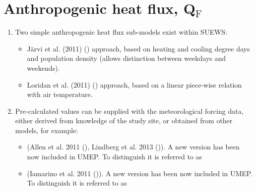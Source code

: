 \documentclass[letterpaper,10pt,english]{sphinxmanual}
\begin{document}
\section{Anthropogenic heat flux, Q$_{\text{F}}$}
\label{\detokenize{parameterisations-and-sub-models:anthropogenic-heat-flux-qf}}\begin{enumerate}
\item {} 
Two simple anthropogenic heat flux sub-models exist within SUEWS:
\begin{itemize}
\item {} 
Järvi et al. (2011) \label{\detokenize{parameterisations-and-sub-models:id3}}{\hyperref[\detokenize{references:j11}]{\sphinxcrossref{{[}J11{]}}}} () approach, based on heating and cooling
degree days and population density (allows distinction between
weekdays and weekends).

\item {} 
Loridan et al. (2011) \label{\detokenize{parameterisations-and-sub-models:id4}}{\hyperref[\detokenize{references:l2011}]{\sphinxcrossref{{[}L2011{]}}}} () approach, based on a linear piece-wise
relation with air temperature.

\end{itemize}

\item {} 
Pre-calculated values can be supplied with the meteorological forcing
data, either derived from knowledge of the study site, or obtained
from other models, for example:
\begin{itemize}
\item {} 
 (Allen et al. 2011 \label{\detokenize{parameterisations-and-sub-models:id5}}{\hyperref[\detokenize{references:lucy}]{\sphinxcrossref{{[}lucy{]}}}} (), Lindberg et al. 2013 \label{\detokenize{parameterisations-and-sub-models:id6}}{\hyperref[\detokenize{references:lucy2}]{\sphinxcrossref{{[}lucy2{]}}}} ()). A
new version has been now included in UMEP. To distinguish it is
referred to as

\item {} 
 (Iamarino et al. 2011 \label{\detokenize{parameterisations-and-sub-models:id7}}{\hyperref[\detokenize{references:i11}]{\sphinxcrossref{{[}I11{]}}}} ()). A new version has been
now included in UMEP. To distinguish it is referred to as

\end{itemize}

\end{enumerate}
\end{document}
